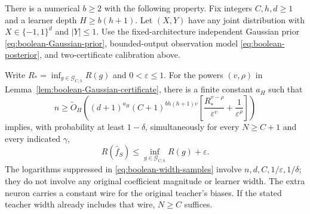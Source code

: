 \begin{theorem}
\label{thm:boolean-width-oracle}
There is a numerical $b\ge2$ with the following property. Fix integers $C,h,d\ge1$ and a learner depth $H\ge b(h+1)$. Let $(X,Y)$ have any joint distribution with $X\in\{-1,1\}^d$ and $|Y|\le1$. Use the fixed-architecture independent Gaussian prior \eqref{eq:boolean-Gaussian-prior}, bounded-output observation model \eqref{eq:boolean-posterior}, and two-certificate calibration above.

Write $R_* =\inf_{g\in\mathcal G_{C,h}}R(g)$ and $0<\varepsilon\le1$. For the powers $(v,\rho)$ in Lemma~\ref{lem:boolean-Gaussian-certificate}, there is a finite constant $a_H$ such that
\begin{equation}
 n\ge\widetilde O_H\left(
  (d+1)^{a_H}(C+1)^{b h(h+1)v}
  \left[\frac{R_*^{v-\rho}}{\varepsilon^v}
                    +\frac1{\varepsilon^\rho}\right]\right)
 \label{eq:boolean-width-samples}
\end{equation}
implies, with probability at least $1-\delta$, simultaneously for every $N\ge C+1$ and every indicated $\gamma$,
\[
 R(\widehat f_S)\le\inf_{g\in\mathcal G_{C,h}}R(g)+\varepsilon.
\]
The logarithms suppressed in \eqref{eq:boolean-width-samples} involve $n,d,C,1/\varepsilon,1/\delta$; they do not involve any original coefficient magnitude or learner width. The extra neuron carries a constant wire for the original teacher's biases. If the stated teacher width already includes that wire, $N\ge C$ suffices.
\end{theorem}

